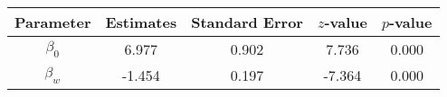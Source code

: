 \begin{table}[ht]
\centering
\begin{tabular}{ccccc}
  \hline
Parameter & Estimates & Standard Error & $z$-value & $p$-value \\ 
  \hline
$\beta_0$ & 6.977 & 0.902 & 7.736 & 0.000 \\ 
  $\beta_w$ & -1.454 & 0.197 & -7.364 & 0.000 \\ 
   \hline
\end{tabular}
\end{table}
